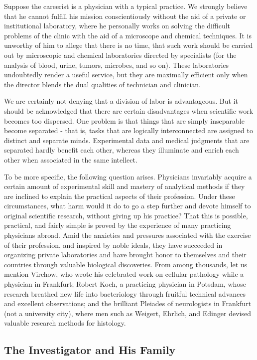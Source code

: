\documentclass{article}
\begin{document}
Suppose the careerist is a physician with a typical practice. We strongly believe that he cannot fulfill his mission conscientiously without the aid of a private or institutional laboratory, where he personally works on solving the difficult problems of the clinic with the aid of a microscope and chemical techniques. It is unworthy of him to allege that there is no time, that such work should be carried out by microscopic and chemical laboratories directed by specialists (for the analysis of blood, urine, tumors, microbes, and so on). These laboratories undoubtedly render a useful service, but they are maximally efficient only when the director blends the dual qualities of technician and clinician.

We are certainly not denying that a division of labor is advantageous. But it should be acknowledged that there are certain disadvantages when scientific work becomes too dispersed. One problem is that things that are simply inseparable become separated - that is, tasks that are logically interconnected are assigned to distinct and separate minds. Experimental data and medical judgments that are separated hardly benefit each other, whereas they illuminate and enrich each other when associated in the same intellect.

To be more specific, the following question arises. Physicians invariably acquire a certain amount of experimental skill and mastery of analytical methods if they are inclined to explain the practical aspects of their profession. Under these circumstances, what harm would it do to go a step further and devote himself to original scientific research, without giving up his practice? That this is possible, practical, and fairly simple is proved by the experience of many practicing physicians abroad. Amid the anxieties and pressures associated with the exercise of their profession, and inspired by noble ideals, they have succeeded in organizing private laboratories and have brought honor to themselves and their countries through valuable biological discoveries. From among thousands, let us mention Virchow, who wrote his celebrated work on cellular pathology while a physician in Frankfurt; Robert Koch, a practicing physician in Potsdam, whose research breathed new life into bacteriology through fruitful technical advances and excellent observations; and the brilliant Pleiades of neurologists in Frankfurt (not a university city), where men such as Weigert, Ehrlich, and Edinger devised valuable research methods for histology.

\subsection*{The Investigator and His Family}
\end{document}
